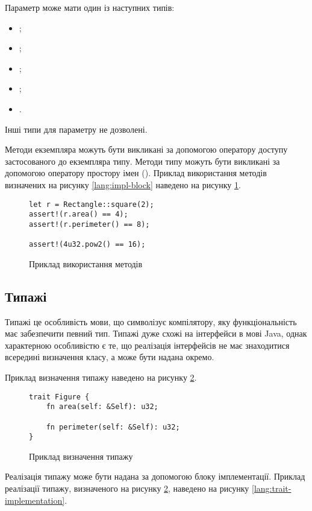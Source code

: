 \documentclass[main.tex]{subfiles}
\begin{document}
Параметр  може мати один із наступних типів:
\begin{itemize}[nosep]
\item {};
\item {};
\item {};
\item {};
\item {}.
\end{itemize}
Інші типи для параметру  не дозволені.

Методи екземпляра можуть бути викликані за допомогою оператору доступу застосованого до екземпляра типу. Методи типу можуть бути викликані за допомогою оператору простору імен (\code{::}). Приклад використання методів визначених на рисунку \ref{lang:impl-block} наведено на рисунку \ref{lang:impl-usage}.

\begin{figure}[h]
  \centering
  \begin{verbatim}
let r = Rectangle::square(2);
assert!(r.area() == 4);
assert!(r.perimeter() == 8);

assert!(4u32.pow2() == 16);
  \end{verbatim}
  \caption{Приклад використання методів}
  \label{lang:impl-usage}
\end{figure}

\FloatBarrier
\subsection{Типажі}
Типажі це особливість мови, що символізує компілятору, яку функціональність має забезпечити певний тип.
Типажі дуже схожі на інтерфейси в мові Java, однак характерною особливістю є те, що реалізація інтерфейсів не має знаходитися всередині визначення класу, а може бути надана окремо.

Приклад визначення типажу наведено на рисунку \ref{lang:trait-declaration}.

\begin{figure}[h]
  \centering
  \begin{verbatim}
trait Figure {
    fn area(self: &Self): u32;

    fn perimeter(self: &Self): u32;
}
  \end{verbatim}
  \caption{Приклад визначення типажу}
  \label{lang:trait-declaration}
\end{figure}

Реалізація типажу може бути надана за допомогою блоку імплементації. Приклад реалізації типажу, визначеного на рисунку \ref{lang:trait-declaration}, наведено на рисунку \ref{lang:trait-implementation}.
\end{document}
